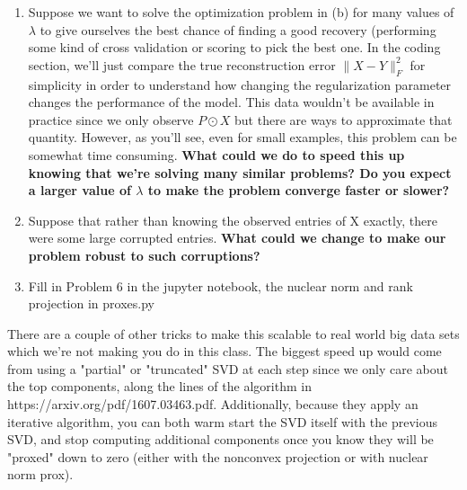 \documentclass[11pt]{amsart}
\begin{document}
\begin{enumerate}
\begin{enumerate}
\item Suppose we want to solve the optimization problem in (b) for many values of $\lambda$ to give ourselves the best chance of finding a good recovery (performing some kind of cross validation or scoring to pick the best one. In the coding section, we'll just compare the true reconstruction error $\|X-Y\|_F^2$ for simplicity in order to understand how changing the regularization parameter changes the performance of the model. This data wouldn't be available in practice since we only observe $P\odot X$ but there are ways to approximate that quantity. However, as you'll see, even for small examples, this problem can be somewhat time consuming. \textbf{What could we do to speed this up knowing that we're solving many similar problems? Do you expect a larger value of $\lambda$ to make the problem converge faster or slower?} 

\item Suppose that rather than knowing the observed entries of X exactly, there were some large corrupted entries. \textbf{What could we change to make our problem robust to such corruptions?}

\item Fill in Problem 6 in the jupyter notebook, the nuclear norm and rank projection in proxes.py

\end{enumerate}
There are a couple of other tricks to make this scalable to real world big data sets which we're not making you do in this class. The biggest speed up would come from using a "partial" or "truncated" SVD at each step since we only care about the top components, along the lines of the algorithm in https://arxiv.org/pdf/1607.03463.pdf. Additionally, because they apply an iterative algorithm, you can both warm start the SVD itself with the previous SVD, and stop computing additional components once you know they will be "proxed" down to zero (either with the nonconvex projection or with nuclear norm prox).
\end{enumerate}
\end{document}
